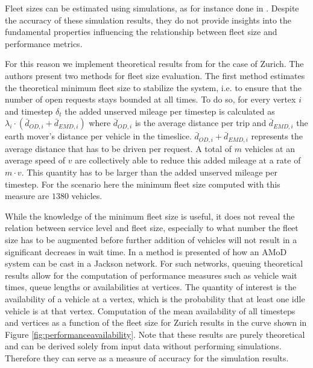 Fleet sizes can be estimated using simulations, as for instance done in
\citep{bischoff2016simulation}. Despite the accuracy of these
simulation results, they do not provide insights into the fundamental
properties influencing the relationship between fleet size and performance metrics.

For this reason we implement theoretical results from \citep{spieser2014toward}
for the case of Zurich. The authors present two methods for fleet size evaluation.
The first method estimates the theoretical minimum fleet size to stabilize
the system, i.e. to ensure that the number of open requests stays bounded at
all times. To do so, for every vertex $i$ and timestep $\delta_t$ the added
unserved mileage per timestep is calculated as
$\lambda_i \cdot ( \bar{d}_{OD,i}  + \bar{d}_{EMD,i})$ where $\bar{d}_{OD,i}$
is the average distance per trip and  $\bar{d}_{EMD,i}$ the earth mover's
distance per vehicle in the timeslice. $\bar{d}_{OD,i}  + \bar{d}_{EMD,i}$
represents the average distance that has to be driven per request. A total of
$m$ vehicles at an average speed of $v$ are collectively able to reduce this
 added mileage at a rate of $m \cdot v$. This quantity has to be larger than the
 added unserved mileage per timestep. For the scenario here the
 minimum fleet size computed with this measure are $1380$ vehicles.

While the knowledge of the minimum fleet size is useful, it does not reveal
the relation between service level and fleet size, especially to what number
the fleet size has to be augmented before further addition of vehicles will
not result in a significant decreaes in wait time. In \citep{zhang2016control}
 a method is presented of how an AMoD system can be cast in a Jackson network.
 For such networks, queuing theoretical results allow for the computation of
 performance measures such as vehicle wait times, queue lengths or
 availabilities at vertices. The quantity of interest is the availability
 of a vehicle at a vertex, which is the probability that at least one idle
 vehicle is at that vertex. Computation of the mean availability of all
 timesteps and vertices as a function of the fleet size for Zurich results
 in the curve shown in Figure \ref{fig:performanceavailability}. Note that these results
 are purely theoretical and can be derived solely from input data without performing simulations.
 Therefore they can serve as a measure of accuracy for the simulation results.
